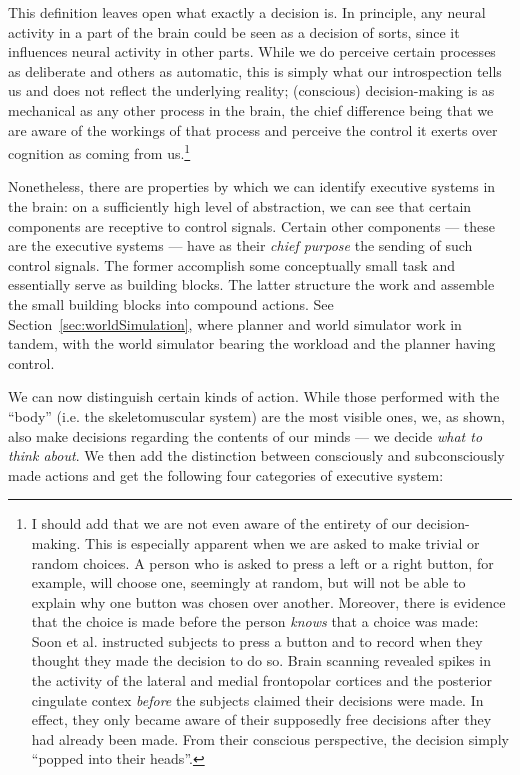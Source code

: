 This definition leaves open what exactly a decision is. In principle, any neural activity in a part of the brain could be seen as a decision of sorts, since it influences neural activity in other parts. While we do perceive certain processes as deliberate and others as automatic, this is simply what our introspection tells us and does not reflect the underlying reality; (conscious) decision-making is as mechanical as any other process in the brain, the chief difference being that we are aware of the workings of that process and perceive the control it exerts over cognition as coming from us.\footnote{I should add that we are not even aware of the entirety of our decision-making. This is especially apparent when we are asked to make trivial or random choices. A person who is asked to press a left or a right button, for example, will choose one, seemingly at random, but will not be able to explain why one button was chosen over another. Moreover, there is evidence that the choice is made before the person {\em knows} that a choice was made: Soon et al. \cite{soon2008} instructed subjects to press a button and to record when they thought they made the decision to do so. Brain scanning revealed spikes in the activity of the lateral and medial frontopolar cortices and the posterior cingulate contex {\em before} the subjects claimed their decisions were made. In effect, they only became aware of their supposedly free decisions after they had already been made. From their conscious perspective, the decision simply ``popped into their heads''.}

Nonetheless, there are properties by which we can identify executive systems in the brain: on a sufficiently high level of abstraction, we can see that certain components are receptive to control signals. Certain other components --- these are the executive systems --- have as their {\em chief purpose} the sending of such control signals. The former accomplish some conceptually small task and essentially serve as building blocks. The latter structure the work and assemble the small building blocks into compound actions. See Section~\ref{sec:worldSimulation}, where planner and world simulator work in tandem, with the world simulator bearing the workload and the planner having control.

We can now distinguish certain kinds of action. While those performed with the ``body'' (i.e. the skeletomuscular system) are the most visible ones, we, as shown, also make decisions regarding the contents of our minds --- we decide {\em what to think about}. We then add the distinction between consciously and subconsciously made actions and get the following four categories of executive system:

